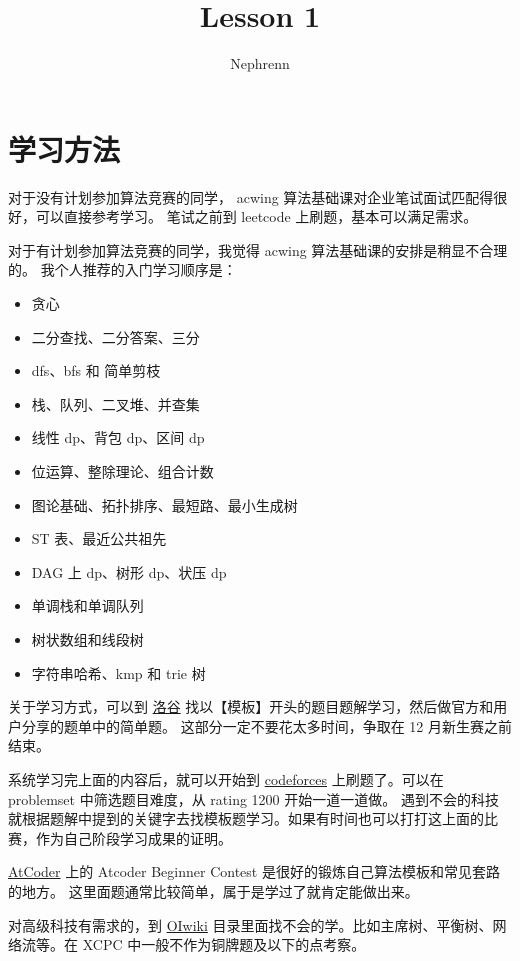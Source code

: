 \documentclass{ctexart}
\title{Lesson 1}
\author{Nephrenn}
\begin{document}
\maketitle
\newpage

\tableofcontents
\newpage

\section{学习方法}
对于没有计划参加算法竞赛的同学， acwing 算法基础课对企业笔试面试匹配得很好，可以直接参考学习。
笔试之前到 leetcode 上刷题，基本可以满足需求。

对于有计划参加算法竞赛的同学，我觉得 acwing 算法基础课的安排是稍显不合理的。
我个人推荐的入门学习顺序是：
\begin{itemize}
    \item 贪心
    \item 二分查找、二分答案、三分
    \item dfs、bfs 和 简单剪枝
    \item 栈、队列、二叉堆、并查集
    \item 线性 dp、背包 dp、区间 dp
    \item 位运算、整除理论、组合计数
    \item 图论基础、拓扑排序、最短路、最小生成树
    \item ST 表、最近公共祖先
    \item DAG 上 dp、树形 dp、状压 dp
    \item 单调栈和单调队列
    \item 树状数组和线段树
    \item 字符串哈希、kmp 和 trie 树
\end{itemize}

关于学习方式，可以到 \href{https://www.luogu.com.cn/}{洛谷} 找以【模板】开头的题目题解学习，然后做官方和用户分享的题单中的简单题。
这部分一定不要花太多时间，争取在 12 月新生赛之前结束。

系统学习完上面的内容后，就可以开始到 \href{https://codeforces.com/}{codeforces} 上刷题了。可以在 problemset 中筛选题目难度，从 rating 1200 开始一道一道做。
遇到不会的科技就根据题解中提到的关键字去找模板题学习。如果有时间也可以打打这上面的比赛，作为自己阶段学习成果的证明。

\href{https://atcoder.jp/}{AtCoder} 上的 Atcoder Beginner Contest 是很好的锻炼自己算法模板和常见套路的地方。
这里面题通常比较简单，属于是学过了就肯定能做出来。

对高级科技有需求的，到 \href{https://oi-wiki.org/}{OIwiki} 目录里面找不会的学。比如主席树、平衡树、网络流等。在 XCPC 中一般不作为铜牌题及以下的点考察。
\end{document}

